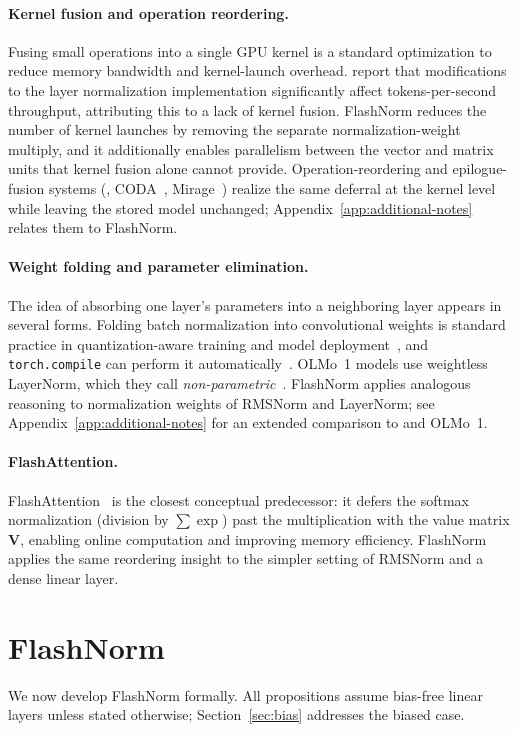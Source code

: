 \documentclass{article}
\begin{document}
\paragraph{Kernel fusion and operation reordering.}
Fusing small operations into a single GPU kernel is a standard optimization to
reduce memory bandwidth and kernel-launch overhead. \citet{openelm} report
that modifications to the layer normalization implementation significantly affect
tokens-per-second throughput, attributing this to a lack of kernel fusion. FlashNorm
reduces the number of kernel launches by removing the separate normalization-weight
multiply, and it additionally enables parallelism between the
vector and matrix units that kernel fusion alone cannot provide.
Operation-reordering and epilogue-fusion systems (\citet{opFusion}, CODA~\citep{coda},
Mirage~\citep{mirage}) realize the same deferral at the kernel level while leaving the
stored model unchanged; Appendix~\ref{app:additional-notes} relates them to FlashNorm.

\paragraph{Weight folding and parameter elimination.}
The idea of absorbing one layer's parameters into a neighboring layer appears in
several forms. Folding batch normalization into convolutional weights is standard
practice in quantization-aware training and model deployment~\citep{quantJacob, convBN},
and \verb+torch.compile+ can perform it automatically~\citep{torchCompileFuse}.
OLMo~1 models use weightless LayerNorm, which they call
\emph{non-parametric}~\citep{olmo2}. FlashNorm applies analogous reasoning to
normalization weights of RMSNorm and LayerNorm; see Appendix~\ref{app:additional-notes}
for an extended comparison to \citet{remove-norm2} and OLMo~1.

\paragraph{FlashAttention.}
FlashAttention~\citep{flash-attention} is the closest conceptual predecessor:
it defers the softmax normalization (division by $\sum \exp$) past the multiplication
with the value matrix $\mathbf{V}$, enabling online computation and improving memory
efficiency. FlashNorm applies the same reordering insight to the simpler setting of
RMSNorm and a dense linear layer.

\section{FlashNorm}
We now develop FlashNorm formally. All propositions assume bias-free linear layers
unless stated otherwise; Section~\ref{sec:bias} addresses the biased case.
\end{document}
